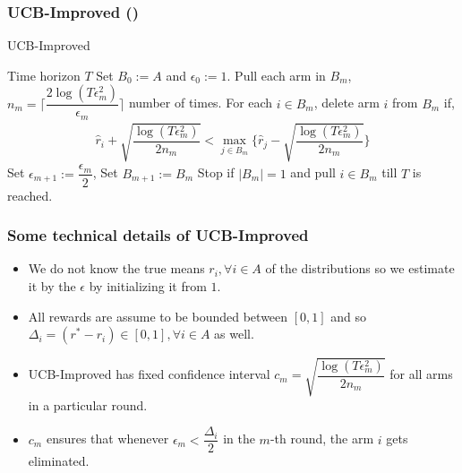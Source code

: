 \begin{frame}
\frametitle{UCB-Improved (\cite{auer2010ucb})}
\begin{algorithm}[H]
\caption{UCB-Improved}
\small
\begin{algorithmic}[1]
 Time horizon $T$
 Set $B_{0}:=A$ and ${\epsilon}_{0}:=1$.
\State Pull each arm in $B_m$, $n_{m}=\bigg\lceil\dfrac{2\log{( T{\epsilon}_{m}^{2})}}{{\epsilon}_{m}}\bigg\rceil$ number of times.
\ArmElim
\State For each $i \in B_{m}$, delete arm ${i}$ from $B_{m}$ if,
\begin{align*}
\hat{r}_{i} + \sqrt{\dfrac{\log{(T{\epsilon}_{m}^{2})}}{2 n_{m}}}  < \max_{{j}\in B_{m}}\bigg\lbrace\hat{r}_{j} -\sqrt{\dfrac{\log{( T{\epsilon}_{m}^{2})}}{2 n_{m}}} \bigg\rbrace
\end{align*}
\EndArmElim
\State Set ${\epsilon}_{m+1}:=\dfrac{{\epsilon}_{m}}{2}$, Set $B_{m+1}:=B_{m}$
\State Stop if $|B_{m}|=1$ and pull ${i}\in B_{m}$ till $T$ is reached.
\EndFor
\end{algorithmic}
\end{algorithm}
\end{frame}

\begin{frame}
\frametitle{Some technical details of UCB-Improved}
\begin{itemize}
\item<1-> We do not know the true means $r_i ,\forall i\in A$ of the distributions so we estimate it by the ${\epsilon}$ by initializing it from $1$.
\item<2-> All rewards are assume to be bounded between $[0,1]$ and so $\Delta_{i} = (r^* - r_i)\in [0,1],\forall i\in A$ as well.
\item<3-> UCB-Improved has fixed confidence interval  $c_{m}=\sqrt{\dfrac{\log{(T{\epsilon}_{m}^{2})}}{2 n_{m}}}$ for all arms in a particular round.
\item<4-> $c_m$ ensures that whenever ${\epsilon}_{m}<\dfrac{\Delta_i}{2}$ in the $m$-th round, the arm $i$ gets eliminated.
\end{itemize}
\end{frame}